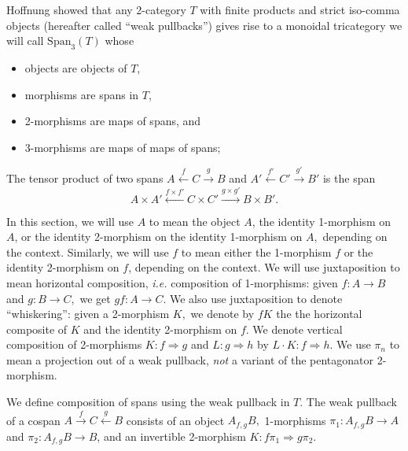 \documentclass{article}
\newcommand{\maps}{\colon}
\newcommand{\Span}{\mbox{Span}}
\begin{document}
Hoffnung showed that any 2-category $T$ with finite products and strict iso-comma objects (hereafter called ``weak pullbacks'') gives rise to a monoidal tricategory we will call $\Span_3(T)$ whose
\begin{itemize}
  \item objects are objects of $T$,
  \item morphisms are spans in $T$,
  \item 2-morphisms are maps of spans, and
  \item 3-morphisms are maps of maps of spans;
\end{itemize}
The tensor product of two spans $A \stackrel{f}{\leftarrow} C \stackrel{g}{\rightarrow} B$ 
and $A' \stackrel{f'}{\leftarrow} C' \stackrel{g'}{\rightarrow} B'$ is the span
\[A \times A' \stackrel{f \times f'}{\leftarrow} C \times C' \stackrel{g \times g'}{\rightarrow} B \times B'.\]

In this section, we will use $A$ to mean the object $A$, the identity 1-morphism on $A$, or the identity 2-morphism on the identity 1-morphism on $A,$ depending on the context.  Similarly, we will use $f$ to mean either the 1-morphism $f$ or the identity 2-morphism on $f$, depending on the context.  We will use juxtaposition to mean horizontal composition, {\em i.e.} composition of 1-morphisms: given $f\maps A \to B$ and $g\maps B \to C,$ we get $gf\maps A \to C.$  We also use juxtaposition to denote ``whiskering'': given a 2-morphism $K,$ we denote by $fK$ the the horizontal composite of $K$ and the identity 2-morphism on $f.$  We denote vertical composition of 2-morphisms $K\maps f\Rightarrow g$ and $L\maps g\Rightarrow h$ by $L\cdot K\maps f\Rightarrow h.$  We use $\pi_n$ to mean a projection out of a weak pullback, {\em not} a variant of the pentagonator 2-morphism.

We define composition of spans using the weak pullback in $T$.  The weak pullback of a cospan $A \stackrel{f}{\to} C \stackrel{g}{\leftarrow} B$ consists of an object $A_{f,g}B,$ 1-morphisms $\pi_1\maps A_{f,g}B \to A$ and $\pi_2\maps A_{f,g}B \to B$, and an invertible 2-morphism $K\maps f\pi_1 \Rightarrow g\pi_2.$  
\end{document}
